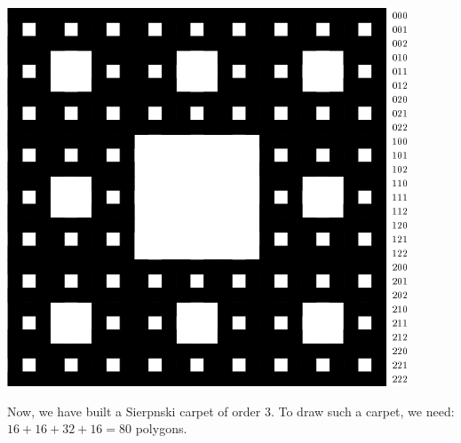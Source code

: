 \begin{itemize}
\begin{center}
\includegraphics{pics/menger-schema06.png}
\end{center}
\end{itemize}
Now, we have built a Sierpnski carpet of order 3. To draw such a carpet, we need: $16+16+32+16=80$ polygons.
